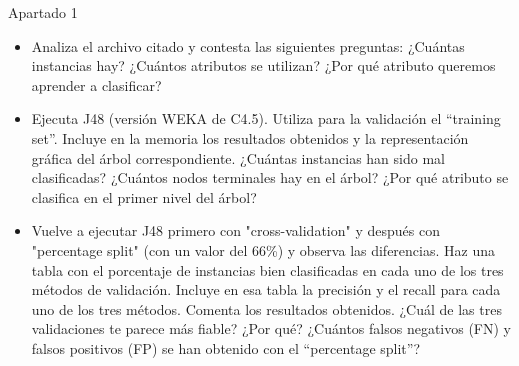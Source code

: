\documentclass[11pt, a4paper, spanish, openright, twoside]{book}
\begin{document}
\begin{section}{Apartado 1}
	
	\begin{itemize} 
	\item Analiza el archivo citado y contesta las siguientes preguntas: ¿Cuántas instancias hay? ¿Cuántos 
	atributos se utilizan? ¿Por qué atributo queremos aprender a clasificar?
 
	\item Ejecuta J48 (versión WEKA de C4.5). Utiliza para la validación el “training set”. Incluye en la 
	memoria los resultados obtenidos y la representación gráfica del árbol correspondiente. ¿Cuántas 
	instancias han sido mal clasificadas? ¿Cuántos nodos terminales hay en el árbol? ¿Por qué atributo 
	se clasifica en el primer nivel del árbol? 

	\item  Vuelve a ejecutar J48 primero con "cross-validation" y después con "percentage split" (con un valor 
	del 66\%) y observa las diferencias. Haz una tabla con el porcentaje de instancias bien clasificadas en 
	cada uno de los tres métodos de validación. Incluye en esa tabla la precisión y el recall para cada 
	uno de los tres métodos. Comenta los resultados obtenidos. ¿Cuál de las tres validaciones te parece 
	más fiable? ¿Por qué? ¿Cuántos falsos negativos (FN) y falsos positivos (FP) se han obtenido con el 
	“percentage split”? 

	\end{itemize}
\end{section}
\end{document}
